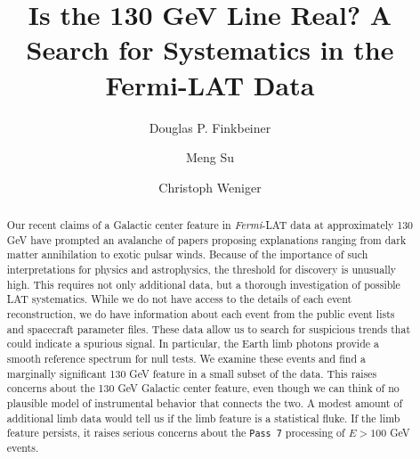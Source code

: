 \documentclass[aps,twocolumn,prd,superscriptaddress,showpacs,nofootinbib,fixfloat]{revtex4}
\newcommand{\Fermi}{{\slshape Fermi}}
\begin{document}
\title{Is the 130 GeV Line Real? 
  A Search for Systematics in the Fermi-LAT Data}

\author{Douglas P. Finkbeiner}

\author{Meng Su}

\author{Christoph Weniger}

\begin{abstract} Our recent claims of a Galactic center
  feature in \Fermi-LAT data at approximately 130 GeV have
  prompted an avalanche of papers proposing explanations
  ranging from dark matter annihilation to exotic pulsar
  winds.  Because of the importance of such interpretations
  for physics and astrophysics, the threshold for discovery
  is unusually high.  This requires not only additional
  data, but a thorough investigation of possible LAT
  systematics.  While we do not have access to the details
  of each event reconstruction, we do have information about
  each event from the public event lists and spacecraft
  parameter files.  These data allow us to search for
  suspicious trends that could indicate a spurious signal.
  In particular, the Earth limb photons provide a smooth
  reference spectrum for null tests.  We examine these
  events and find a marginally significant 130 GeV feature
  in a small subset of the data.  This raises concerns about
  the 130 GeV Galactic center feature, even though we can
  think of no plausible model of instrumental behavior that
  connects the two.  A modest amount of additional limb data
  would tell us if the limb feature is a statistical fluke.
  If the limb feature persists, it raises serious concerns
  about the \texttt{Pass 7} processing of $E > 100$ GeV events.
\end{abstract}

\pacs{}

\maketitle
\end{document}
